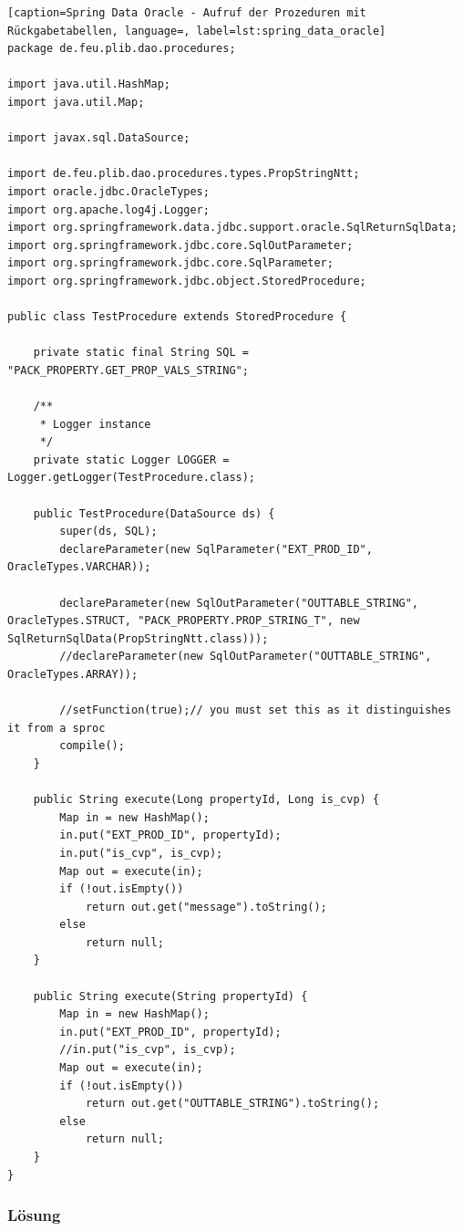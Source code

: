 \begin{lstlisting}[caption=Spring Data Oracle - Aufruf der Prozeduren mit Rückgabetabellen, language=, label=lst:spring_data_oracle]
package de.feu.plib.dao.procedures;

import java.util.HashMap;
import java.util.Map;

import javax.sql.DataSource;

import de.feu.plib.dao.procedures.types.PropStringNtt;
import oracle.jdbc.OracleTypes;
import org.apache.log4j.Logger;
import org.springframework.data.jdbc.support.oracle.SqlReturnSqlData;
import org.springframework.jdbc.core.SqlOutParameter;
import org.springframework.jdbc.core.SqlParameter;
import org.springframework.jdbc.object.StoredProcedure;

public class TestProcedure extends StoredProcedure {

    private static final String SQL = "PACK_PROPERTY.GET_PROP_VALS_STRING";

    /**
     * Logger instance
     */
    private static Logger LOGGER = Logger.getLogger(TestProcedure.class);

	public TestProcedure(DataSource ds) {
		super(ds, SQL);
		declareParameter(new SqlParameter("EXT_PROD_ID", OracleTypes.VARCHAR));

		declareParameter(new SqlOutParameter("OUTTABLE_STRING", OracleTypes.STRUCT, "PACK_PROPERTY.PROP_STRING_T", new SqlReturnSqlData(PropStringNtt.class)));
		//declareParameter(new SqlOutParameter("OUTTABLE_STRING", OracleTypes.ARRAY));

		//setFunction(true);// you must set this as it distinguishes it from a sproc
		compile();
	}

	public String execute(Long propertyId, Long is_cvp) {
		Map in = new HashMap();
		in.put("EXT_PROD_ID", propertyId);
        in.put("is_cvp", is_cvp);
		Map out = execute(in);
		if (!out.isEmpty())
			return out.get("message").toString();
		else
			return null;
	}

    public String execute(String propertyId) {
		Map in = new HashMap();
		in.put("EXT_PROD_ID", propertyId);
        //in.put("is_cvp", is_cvp);
		Map out = execute(in);
		if (!out.isEmpty())
			return out.get("OUTTABLE_STRING").toString();
		else
			return null;
	}
}
\end{lstlisting}


\subsubsection{Lösung}

